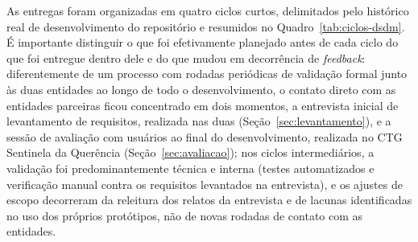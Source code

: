 \documentclass[12pt,a4paper]{article}
\begin{document}
As entregas foram organizadas em quatro ciclos curtos, delimitados pelo histórico real de
desenvolvimento do repositório e resumidos no Quadro~\ref{tab:ciclos-dsdm}. É importante distinguir o
que foi efetivamente planejado antes de cada ciclo do que foi entregue dentro dele e do que mudou em
decorrência de \textit{feedback}: diferentemente de um processo com rodadas periódicas de validação
formal junto às duas entidades ao longo de todo o desenvolvimento, o contato direto com as entidades
parceiras ficou concentrado em dois momentos, a entrevista inicial de levantamento de requisitos,
realizada nas duas (Seção~\ref{sec:levantamento}), e a sessão de avaliação com usuários ao final do
desenvolvimento, realizada no CTG Sentinela da Querência (Seção~\ref{sec:avaliacao}); nos ciclos intermediários, a validação foi predominantemente técnica e
interna (testes automatizados e verificação manual contra os requisitos levantados na entrevista), e
os ajustes de escopo decorreram da releitura dos relatos da entrevista e de lacunas identificadas no
uso dos próprios protótipos, não de novas rodadas de contato com as entidades.
\end{document}
